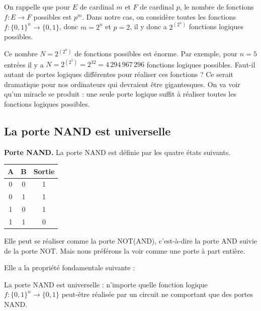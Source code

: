 \documentclass[11pt,class=report,crop=false]{standalone}
\begin{document}
On rappelle que pour $E$ de cardinal $m$ et $F$ de cardinal $p$, le nombre de  fonctions $f : E \to F$ possibles est $p^m$.
Dans notre cas, on considère toutes les fonctions $f : \{0,1\}^n \to \{0,1\}$, donc $m=2^n$ et $p=2$, 
il y donc a $2^{(2^n)}$ fonctions logiques possibles.


Ce nombre $N=2^{(2^n)}$ de fonctions possibles est énorme. Par exemple, pour $n=5$ entrées il y a
$N = 2^{(2^5)} = 2^{32} = 4\,294\,967\,296$ fonctions logiques possibles.
Faut-il autant de portes logiques différentes pour réaliser ces fonctions ? Ce serait dramatique pour nos ordinateurs qui devraient être gigantesques.
On va voir qu'un miracle se produit : une seule porte logique suffit à réaliser toutes les fonctions logiques possibles.


\subsection{La porte NAND est universelle}


\textbf{Porte NAND.}
La porte NAND est définie par les quatre états suivants.



\begin{center}
\begin{minipage}{0.45\textwidth}
\begin{center}
\begin{tabular}{|c|c|c|}
\hline
A & B & Sortie \\ \hline\hline
0 & 0 & 1 \\
0 & 1 & 1 \\
1 & 0 & 1 \\
1 & 1 & 0 \\ \hline
\end{tabular}
\end{center}
\end{minipage}
\begin{minipage}{0.45\textwidth}
\end{minipage}
\end{center}


Elle peut se réaliser comme la porte NOT(AND), c'est-à-dire la porte AND suivie de  la porte NOT.
Mais nous préférons la voir comme une porte à part entière. 

Elle a la propriété fondamentale suivante :
\begin{theoreme}
La porte NAND est universelle : n'importe quelle fonction logique $f : \{0,1\}^n \to \{0,1\}$
peut-être réalisée par un circuit ne comportant que des portes NAND.
\end{theoreme}
\end{document}
